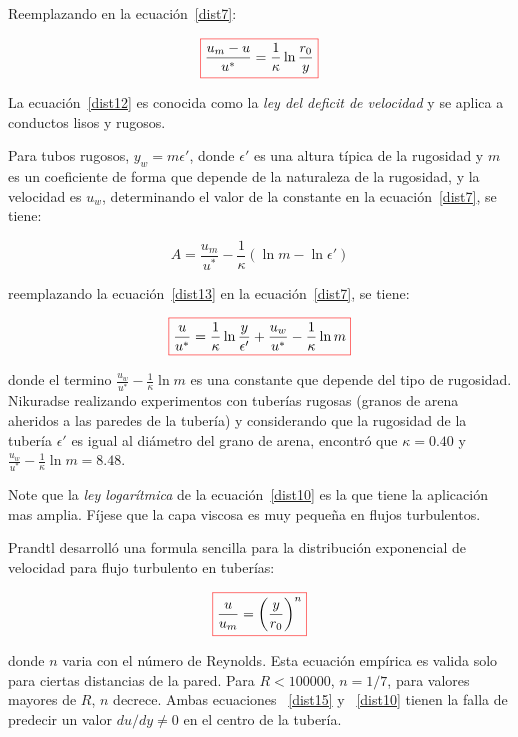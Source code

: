 \documentclass[11pt, oneside]{article}
\begin{document}
Reemplazando en la ecuaci\'on~\ref{dist7}:

\begin{equation}
\color{red}\boxed{\color{black} \frac{u_m-u}{u^*} = \frac{1}{\kappa} \ln \frac{r_0}{y} }
\label{dist12}
\end{equation}

La ecuaci\'on~\ref{dist12} es conocida como la \emph{ley del deficit de velocidad} y se aplica a conductos lisos y rugosos.

Para tubos rugosos, $y_w = m \epsilon '$, donde $\epsilon '$ es una altura t\'ipica de la rugosidad y $m$ es un coeficiente de forma que depende de la naturaleza de la rugosidad, y la velocidad es $u_w$, determinando el valor de la constante en la ecuaci\'on~\ref{dist7}, se tiene:
 
\begin{equation}
A = \frac{u_m}{u^*} - \frac{1}{\kappa} (\ln m - \ln \epsilon ')
\label{dist13}
\end{equation}

reemplazando la ecuaci\'on~\ref{dist13} en la ecuaci\'on~\ref{dist7}, se tiene:

\begin{equation}
\color{red}\boxed{\color{black} \frac{u}{u^*} = \frac{1}{\kappa}\ln \frac{y}{\epsilon '} + \frac{u_w}{u^*}-\frac{1}{\kappa}\ln m }
\label{dist14}
\end{equation}

donde el termino $\frac{u_w}{u^*}-\frac{1}{\kappa}\ln m$ es una constante que depende del tipo de rugosidad. Nikuradse realizando experimentos con tuber\'ias rugosas (granos de arena aheridos a las paredes de la tuber\'ia) y considerando que la rugosidad de la tuber\'ia $\epsilon '$ es igual al di\'ametro del grano de arena, encontr\'o que $\kappa = 0.40$ y $\frac{u_w}{u^*}-\frac{1}{\kappa}\ln m =8.48$. 

Note que la \emph{ley logar\'itmica} de la ecuaci\'on~\ref{dist10} es la que tiene la aplicaci\'on mas amplia. F\'ijese que la capa viscosa es muy peque\~na en flujos turbulentos.

Prandtl desarroll\'o una formula sencilla para la distribuci\'on exponencial de velocidad para flujo turbulento en tuber\'ias:

\begin{equation}
\color{red}\boxed{\color{black} \frac{u}{u_m } = \left( \frac{y}{r_0} \right)^n  }
\label{dist15}
\end{equation}

donde $n$ varia con el n\'umero de Reynolds. Esta ecuaci\'on emp\'irica es valida solo para ciertas distancias de la pared. Para $R < 100000$, $n=1/7$, para valores mayores de $R$, $n$ decrece. Ambas ecuaciones ~\ref{dist15} y ~\ref{dist10} tienen la falla de predecir un valor $du/dy \neq 0$ en el centro de la tuber\'ia.
\end{document}
